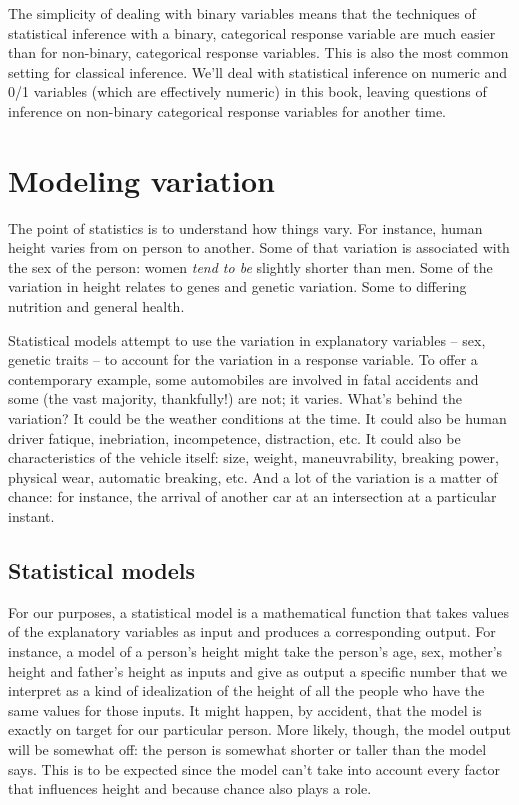 \documentclass[]{book}
\begin{document}
The simplicity of dealing with binary variables means that the techniques of statistical inference with a binary, categorical response variable are much easier than for non-binary, categorical response variables. This is also the most common setting for classical inference. We'll deal with statistical inference on numeric and 0/1 variables (which are effectively numeric) in this book, leaving questions of inference on non-binary categorical response variables for another time.

\hypertarget{modeling-variation}{%
\chapter{Modeling variation}\label{modeling-variation}}

The point of statistics is to understand how things vary. For instance, human height varies from on person to another. Some of that variation is associated with the sex of the person: women \emph{tend to be} slightly shorter than men. Some of the variation in height relates to genes and genetic variation. Some to differing nutrition and general health.

Statistical models attempt to use the variation in explanatory variables -- sex, genetic traits -- to account for the variation in a response variable. To offer a contemporary example, some automobiles are involved in fatal accidents and some (the vast majority, thankfully!) are not; it varies. What's behind the variation? It could be the weather conditions at the time. It could also be human driver fatique, inebriation, incompetence, distraction, etc. It could also be characteristics of the vehicle itself: size, weight, maneuvrability, breaking power, physical wear, automatic breaking, etc. And a lot of the variation is a matter of chance: for instance, the arrival of another car at an intersection at a particular instant.

\hypertarget{statistical-models}{%
\section{Statistical models}\label{statistical-models}}

For our purposes, a statistical model is a mathematical function that takes values of the explanatory variables as input and produces a corresponding output. For instance, a model of a person's height might take the person's age, sex, mother's height and father's height as inputs and give as output a specific number that we interpret as a kind of idealization of the height of all the people who have the same values for those inputs. It might happen, by accident, that the model is exactly on target for our particular person. More likely, though, the model output will be somewhat off: the person is somewhat shorter or taller than the model says. This is to be expected since the model can't take into account every factor that influences height and because chance also plays a role.
\end{document}

